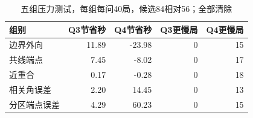 \begin{table}[H]\centering\small\caption{五组压力测试，每组每问40局，候选84相对56；全部清除}\begin{tabular}{lrrrr}\toprule 组别&Q3节省秒&Q4节省秒&Q3更慢局&Q4更慢局\\\midrule
边界外向&11.89&-23.98&0&15\\
共线端点&7.45&-8.02&0&17\\
近重合&0.17&-0.28&0&18\\
相关角误差&2.20&14.45&0&13\\
分区端点误差&4.29&60.23&0&15\\
\bottomrule\end{tabular}\end{table}